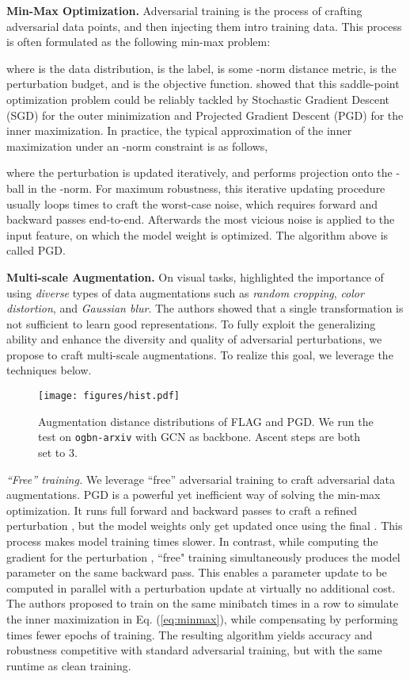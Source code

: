 \documentclass[11pt]{article}
\begin{document}
{\bf Min-Max Optimization.} Adversarial training is the process of crafting adversarial data points, and then injecting them intro training data. This process is often formulated as the following min-max problem:

where  is the data distribution,  is the label,  is some -norm distance metric,  is the perturbation budget, and  is the objective function. \citet{madry2017towards} showed that this saddle-point optimization problem could be reliably tackled by Stochastic Gradient Descent (SGD) for the outer minimization and Projected Gradient Descent (PGD) for the inner maximization. In practice, the typical approximation of the inner maximization under an -norm constraint is as follows,

where the perturbation  is updated iteratively, and  performs projection onto the -ball in the -norm. For maximum robustness, this iterative updating procedure usually loops  times to craft the worst-case noise, which requires  forward and backward passes end-to-end. Afterwards the most vicious noise  is applied to the input feature, on which the model weight is optimized. The algorithm above is called PGD.



\textbf{Multi-scale Augmentation.} On visual tasks, \citet{chen2020simple} highlighted the importance of using \textit{diverse} types of data augmentations such as \textit{random cropping}, \textit{color distortion}, and \textit{Gaussian blur}. The authors showed that a single transformation is not sufficient to learn good representations. To fully exploit the generalizing ability and enhance the diversity and quality of adversarial perturbations, we propose to craft multi-scale augmentations. To realize this goal, we leverage the techniques below.

\begin{figure}[t]\centering
    \texttt{[image: figures/hist.pdf]} \caption{Augmentation distance distributions of FLAG and PGD. We run the test on \texttt{ogbn-arxiv} with GCN as backbone. Ascent steps are both set to 3.}\label{fig:hist}\end{figure}

\textit{``Free'' training.} We leverage ``free'' adversarial training \citep{shafahi2019adversarial} to craft adversarial data augmentations. PGD is a powerful yet inefficient way of solving the min-max optimization. It runs  full forward and backward passes to craft a refined perturbation , but the model weights  only get updated once using the final .  This process makes model training  times slower. In contrast, while computing the gradient for the perturbation , ``free" training simultaneously produces the model parameter  on the same backward pass. This enables a parameter update to be computed in parallel with a perturbation update at virtually no additional cost. The authors proposed to train on the same minibatch  times in a row to simulate the inner maximization in Eq. (\ref{eq:minmax}), while compensating by performing  times fewer epochs of training. The resulting algorithm yields accuracy and robustness competitive with standard adversarial training, but with the same runtime as clean training.
\end{document}

